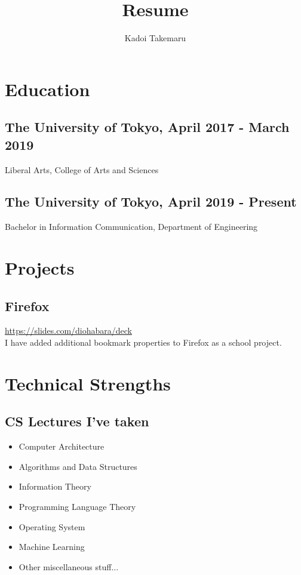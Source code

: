 \documentclass{article}
\title{Resume}
\author{Kadoi Takemaru}
\begin{document}
\maketitle

\section*{Education}
    \subsection*{The University of Tokyo, April 2017 - March 2019}
        Liberal Arts, College of Arts and Sciences
    \subsection*{The University of Tokyo, April 2019 - Present}
        Bachelor in Information Communication, Department of Engineering

\section*{Projects}
    \subsection*{Firefox}
        \url{https://slides.com/diohabara/deck}
        \\ I have added additional bookmark properties to Firefox as a school project.


\section*{Technical Strengths}
    \subsection*{CS Lectures I've taken}
        \begin{itemize}
            \item Computer Architecture
            \item Algorithms and Data Structures
            \item Information Theory
            \item Programming Language Theory
            \item Operating System
            \item Machine Learning
            \item Other miscellaneous stuff...
        \end{itemize}
\end{document}
